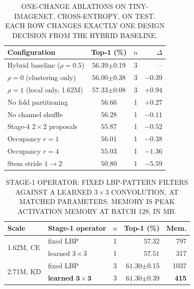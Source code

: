 \begin{table}[!t]
\renewcommand{\arraystretch}{1.15}
\caption{\uppercase{One-change ablations on Tiny-ImageNet, cross-entropy, on
test. Each row changes exactly one design decision from the hybrid baseline.}}
\label{tab:ablation}
\centering
\footnotesize
\begin{tabular}{@{}lccr@{}}
\toprule
Configuration & Top-1 (\%) & $n$ & $\Delta$ \\
\midrule
Hybrid baseline ($\rho{=}0.5$) & $56.39${\scriptsize$\pm$0.19} & 3 & -- \\
\midrule
$\rho = 0$ (clustering only) & $56.00${\scriptsize$\pm$0.38} & 3 & $-0.39$ \\
$\rho = 1$ (local only, 1.62M) & $57.33${\scriptsize$\pm$0.08} & 3 & $\mathbf{+0.94}$ \\
\midrule
No fold partitioning & $56.66$ & 1 & $+0.27$ \\
No channel shuffle & $56.28$ & 1 & $-0.11$ \\
Stage-4 $2\times2$ proposals & $55.87$ & 1 & $-0.52$ \\
Occupancy $r = 1$ & $56.01$ & 1 & $-0.38$ \\
Occupancy $r = 4$ & $55.03$ & 1 & $-1.36$ \\
Stem stride $1 \rightarrow 2$ & $50.80$ & 1 & $\mathbf{-5.59}$ \\
\bottomrule
\end{tabular}
\end{table}

\begin{table}[!t]
\renewcommand{\arraystretch}{1.15}
\caption{\uppercase{Stage-1 operator: fixed LBP-pattern filters against a learned
$3\times3$ convolution, at matched parameters. Memory is peak activation
memory at batch 128, in MB.}}
\label{tab:operator}
\centering
\footnotesize
\begin{tabular}{@{}llcrr@{}}
\toprule
Scale & Stage-1 operator & $n$ & Top-1 (\%) & Mem. \\
\midrule
\multirow{2}{*}{1.62M, CE} & fixed LBP & 1 & $57.32$ & 797 \\
 & learned $3\times3$ & 1 & $57.51$ & 317 \\
\midrule
\multirow{2}{*}{2.71M, KD} & fixed LBP & 3 & $61.30${\scriptsize$\pm$0.15} & 1037 \\
 & \textbf{learned} $\mathbf{3\times3}$ & 3 & $61.30${\scriptsize$\pm$0.39} & \textbf{415} \\
\bottomrule
\end{tabular}
\end{table}

